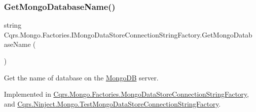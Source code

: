 \mbox{\label{interfaceCqrs_1_1Mongo_1_1Factories_1_1IMongoDataStoreConnectionStringFactory_a90de27c2bf23d7f9412d55c09ab2ec8c_a90de27c2bf23d7f9412d55c09ab2ec8c}} 
\subsubsection{\texorpdfstring{Get\+Mongo\+Database\+Name()}{GetMongoDatabaseName()}}
{\footnotesize\ttfamily string Cqrs.\+Mongo.\+Factories.\+I\+Mongo\+Data\+Store\+Connection\+String\+Factory.\+Get\+Mongo\+Database\+Name (\begin{DoxyParamCaption}{ }\end{DoxyParamCaption})}



Get the name of database on the \hyperlink{namespaceCqrs_1_1MongoDB}{Mongo\+DB} server. 



Implemented in \hyperlink{classCqrs_1_1Mongo_1_1Factories_1_1MongoDataStoreConnectionStringFactory_a7f330359f2db5b86ad28ac7d8a4c49f1_a7f330359f2db5b86ad28ac7d8a4c49f1}{Cqrs.\+Mongo.\+Factories.\+Mongo\+Data\+Store\+Connection\+String\+Factory}, and \hyperlink{classCqrs_1_1Ninject_1_1Mongo_1_1TestMongoDataStoreConnectionStringFactory_ac638a5771711c1d0746ee0ec55c5e192_ac638a5771711c1d0746ee0ec55c5e192}{Cqrs.\+Ninject.\+Mongo.\+Test\+Mongo\+Data\+Store\+Connection\+String\+Factory}.


